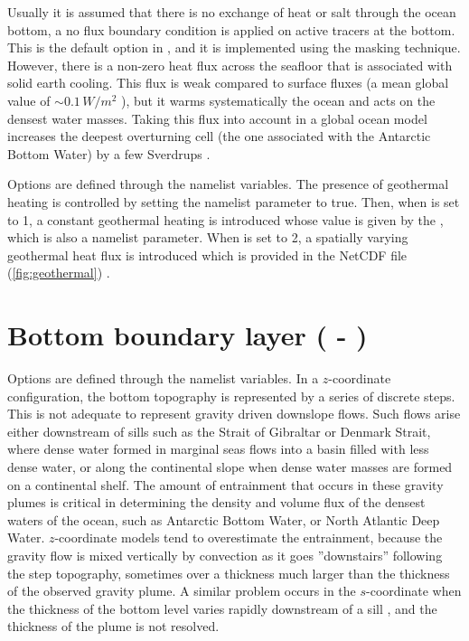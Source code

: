 \documentclass[../main/NEMO_manual]{subfiles}
\begin{document}
Usually it is assumed that there is no exchange of heat or salt through the ocean bottom,
\ie a no flux boundary condition is applied on active tracers at the bottom.
This is the default option in \NEMO, and it is implemented using the masking technique.
However, there is a non-zero heat flux across the seafloor that is associated with solid earth cooling.
This flux is weak compared to surface fluxes (a mean global value of $\sim 0.1 \, W/m^2$ \citep{Stein_Stein_Nat92}),
but it warms systematically the ocean and acts on the densest water masses.
Taking this flux into account in a global ocean model increases the deepest overturning cell
(\ie the one associated with the Antarctic Bottom Water) by a few Sverdrups \citep{Emile-Geay_Madec_OS09}.

Options are defined through the   namelist variables.
The presence of geothermal heating is controlled by setting the namelist parameter  to true.
Then, when  is set to 1, a constant geothermal heating is introduced whose value is given by
the , which is also a namelist parameter.
When  is set to 2, a spatially varying geothermal heat flux is introduced which is provided in
the  NetCDF file (\autoref{fig:geothermal}) \citep{Emile-Geay_Madec_OS09}.

\section{Bottom boundary layer (\protect{} - \protect{})}
\label{sec:TRA_bbl}


Options are defined through the  namelist variables.
In a $z$-coordinate configuration, the bottom topography is represented by a series of discrete steps.
This is not adequate to represent gravity driven downslope flows.
Such flows arise either downstream of sills such as the Strait of Gibraltar or Denmark Strait,
where dense water formed in marginal seas flows into a basin filled with less dense water,
or along the continental slope when dense water masses are formed on a continental shelf.
The amount of entrainment that occurs in these gravity plumes is critical in determining the density and
volume flux of the densest waters of the ocean, such as Antarctic Bottom Water, or North Atlantic Deep Water.
$z$-coordinate models tend to overestimate the entrainment,
because the gravity flow is mixed vertically by convection as it goes ''downstairs'' following the step topography,
sometimes over a thickness much larger than the thickness of the observed gravity plume.
A similar problem occurs in the $s$-coordinate when the thickness of the bottom level varies rapidly downstream of
a sill \citep{Willebrand_al_PO01}, and the thickness of the plume is not resolved.
\end{document}
